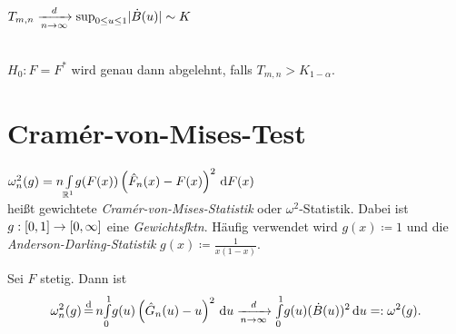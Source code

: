 \documentclass{cheat-sheet}
\newcommand{\E}{\mathbb{E}} %
\newcommand{\ind}{\mathbbm{1}} %
\DeclareMathOperator*{\eqqd}{\stackrel{d}{=}} %
\DeclareMathOperator{\var}{Var} %
\newcommand{\Normal}{\mathcal{N}} %
\begin{document}
\iffalse
\begin{bem}
  Asymptotik von $T_{n,m}$ für $m, n \to \infty$
  \[
    X_{m,n}(u) \coloneqq \sqrt{\tfrac{m \cdot n}{m + n}} \left( \hat{G}_n(u) - \hat{G}^*_m(u) \right), \quad
    0 \leq u \leq 1.
  \]
  \[
    \E X_{m,n} = \sqrt{\tfrac{m \cdot n}{m + n}} \left( \E \ind_{\cinterval{0}{u}}(U_1) - \E \ind_{\cinterval{0}{u}}(U^*_1) \right) = 0
  \]
  \[
    \var(X_{m,n}) = \tfrac{m \cdot n}{m + n} \left( \E (\hat{G}_n(u))^2 + \E (\hat{G}_m(u))^2 - 2 \E \hat{G}^*_n(u) \cdot \E \hat{G}^*_m(u) \right)
  \]

  Genauso wie oben ergibt sich
  \[
    (X_{m,n}(u_1), \ldots, X_{m,n}(u_k)) \xra[n \to \infty]{d} \Normal_k(0, \Sigma)
    \quad \text{mit} \quad
    \Sigma_{ij} = u_i \wedge u_j - u_i \cdot u_j.
  \]

  Daraus folgt die schwache Konvergenz
  \[ X_{m,n}(\blank) \xra[n \to \infty]{d} \dot{B}(\blank) \]
  im Skorodoch-Raum $\mathcal{D} \cinterval{0}{1}$.
\end{bem}
\fi

\begin{lem}
  $T_{m,n} \xrightarrow[n \to \infty]{d} \sup_{0 \leq u \leq 1} \lvert\dot{B}(u)\rvert \sim K$
\end{lem}

\begin{entscheidungsregel} \mbox{}\\
  $H_0 : F = F^*$ wird genau dann abgelehnt, falls $T_{m,n} > K_{1-\alpha}$.
\end{entscheidungsregel}

\section{Cramér-von-Mises-Test}


\begin{defn}
  $\omega_n^2(g) = n {\textstyle \int\limits_{\mathbb{R}^1}^{}} g(F(x)) \left( \hat{F}_n(x) - F(x) \right)^2 \,\mathrm{d} F(x)$ \\
  heißt gewichtete \emph{Cramér-von-Mises-Statistik} oder $\omega^2$-Statistik.
  Dabei ist $g : \left[ 0, 1 \right] \to \left[ 0, \infty \right]$ eine \textit{Gewichtsfktn}.
  Häufig verwendet wird
  $g(x) \coloneqq 1$
  und die \emph{Anderson-Darling-Statistik} $g(x) \coloneqq \tfrac{1}{x (1-x)}$.
\end{defn}

\begin{satz}
  Sei $F$ stetig.
  Dann ist
  \[
    \omega_n^2(g) \eqqd n \Int{0}{1}{g(u) \left( \hat{G}_n(u) - u \right)^2}{u}
    \xra[n \to \infty]{d} \Int{0}{1}{g(u) (\dot{B}(u))^2}{u} =: \omega^2(g).
  \]
\end{satz}
\end{document}
